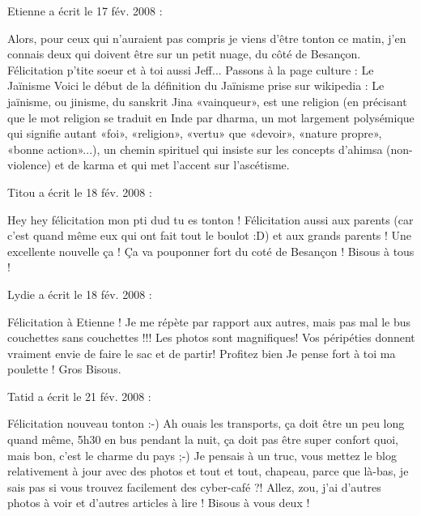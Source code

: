 \medskip
Etienne a écrit le 17 fév. 2008 :
\begin{displayquote}
Alors, pour ceux qui n'auraient pas compris je viens d'être tonton ce matin, j'en connais deux qui doivent être sur un petit nuage, du côté de Besançon. Félicitation p'tite soeur et à toi aussi Jeff...
Passons à la page culture : Le Jaïnisme
Voici le début de la définition du Jaïnisme prise sur wikipedia : Le jaïnisme, ou jinisme, du sanskrit Jina «vainqueur», est une religion (en précisant que le mot religion se traduit en Inde par dharma, un mot largement polysémique qui signifie autant «foi», «religion», «vertu» que «devoir», «nature propre», «bonne action»...), un chemin spirituel qui insiste sur les concepts d'ahimsa (non-violence) et de karma et qui met l'accent sur l'ascétisme.
\end{displayquote}

\medskip
Titou a écrit le 18 fév. 2008 :
\begin{displayquote}
Hey hey félicitation mon pti dud tu es tonton ! Félicitation aussi aux parents (car c'est quand même eux qui ont fait tout le boulot :D) et aux grands parents ! Une excellente nouvelle ça ! Ça va pouponner fort du coté de Besançon ! Bisous à tous !
\end{displayquote}

\medskip
Lydie a écrit le 18 fév. 2008 :
\begin{displayquote}
Félicitation à Etienne !
Je me répète par rapport aux autres, mais pas mal le bus couchettes sans couchettes !!!
Les photos sont magnifiques! Vos péripéties donnent vraiment envie de faire le sac et de partir!
Profitez bien
Je pense fort à toi ma poulette !
Gros Bisous.
\end{displayquote}

\medskip
Tatid a écrit le 21 fév. 2008 :
\begin{displayquote}
Félicitation nouveau tonton :-)
Ah ouais les transports, ça doit être un peu long quand même, 5h30 en bus pendant la nuit, ça doit pas être super confort quoi, mais bon, c'est le charme du pays ;-)
Je pensais à un truc, vous mettez le blog relativement à jour avec des photos et tout et tout, chapeau, parce que là-bas, je sais pas si vous trouvez facilement des cyber-café ?!
Allez, zou, j'ai d'autres photos à voir et d'autres articles à lire !
Bisous à vous deux !
\end{displayquote}

\vfill
